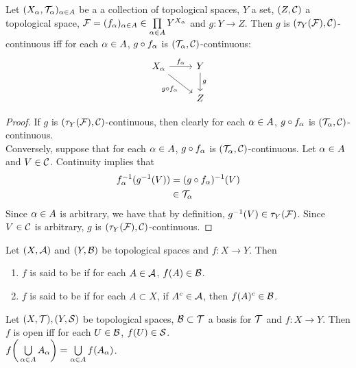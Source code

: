 \documentclass{book}
\begin{document}
	\begin{ex} 
	Let $(X_{\alpha}, \mathcal{T}_{\alpha})_{\alpha \in A}$ be a a collection of topological spaces, $Y$ a set, $(Z, \mathcal{C})$ a topological space, $\mathcal{F} = (f_{\alpha})_{\alpha \in A} \in \prod \limits_{\alpha \in A}Y^{X_{\alpha}}$ and $g: Y \rightarrow Z$. Then $g$ is $(\tau_Y(\mathcal{F}), \mathcal{C})$-continuous iff for each $\alpha \in A$, $g \circ f_{\alpha}$ is $(\mathcal{T}_{\alpha}, \mathcal{C})$-continuous:
	\[ \begin{tikzcd}
	X_{\al} \arrow[r, "f_{\al}"] \arrow[dr, "g \circ f_{\al}"'] 	
	& Y  \arrow[d, "g"] \\
	& Z 
\end{tikzcd}
	\]
	\end{ex}
	
	\begin{proof}
	If $g$ is $(\tau_Y(\mathcal{F}), \mathcal{C})$-continuous, then clearly for each $\alpha \in A$, $g \circ f_{\alpha}$ is $(\mathcal{T}_{\alpha}, \mathcal{C})$-continuous. \\
	Conversely, suppose that for each $\alpha \in A$, $g \circ f_{\alpha}$ is $(\mathcal{T}_{\alpha}, \mathcal{C})$-continuous. Let $\alpha \in A$ and $V \in \mathcal{C}$. Continuity implies that 
	\begin{align*}
		f_{\alpha}^{-1}(g^{-1}(V)) 
		& = (g \circ f_{\alpha})^{-1}(V) \\
		& \in \mathcal{T}_{\alpha}
	\end{align*}
	Since $\alpha \in A$ is arbitrary, we have that by definition, $g^{-1}(V) \in \tau_Y(\mathcal{F})$. Since $V \in \mathcal{C}$ is arbitrary, $g$ is $(\tau_Y(\mathcal{F}), \mathcal{C})$-continuous.
	\end{proof}
	
	\begin{defn} 
		Let $(X,\mathcal{A})$ and $(Y,\mathcal{B})$ be topological spaces and $f:X \rightarrow Y$. Then 
		\begin{enumerate}
			\item $f$ is said to be  if for each $A \in \mathcal{A}$, $f(A) \in \mathcal{B}$.
			\item $f$ is said to be  if for each $A \subset X$, if $A^c \in \mathcal{A}$, then $f(A)^c \in \mathcal{B}$. 
		\end{enumerate}
	\end{defn}

	\begin{ex} 
		Let $(X, \mathcal{T}), (Y, \mathcal{S})$ be topological spaces, $\mathcal{B} \subset \mathcal{T}$ a basis for $\mathcal{T}$ and $f: X \rightarrow Y$. Then $f$ is open iff for each $U \in \mathcal{B}$, $f(U) \in \mathcal{S}$.\\
		 $f\bigg( \bigcup\limits_{\alpha \in A} A_{\alpha} \bigg) =  \bigcup\limits_{\alpha \in A} f(A_{\alpha})$.
	\end{ex}
\end{document}
